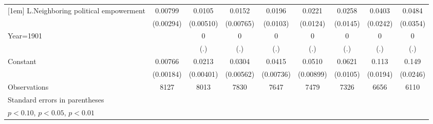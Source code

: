 \begin{table}[htbp]
\begin{tabular}{l*{8}{c}}
[1em]
L.Neighboring political empowerment&     0.00799\sym{***}&      0.0105\sym{**} &      0.0152\sym{**} &      0.0196\sym{*}  &      0.0221\sym{*}  &      0.0258\sym{*}  &      0.0403\sym{*}  &      0.0484         \\
                    &   (0.00294)         &   (0.00510)         &   (0.00765)         &    (0.0103)         &    (0.0124)         &    (0.0145)         &    (0.0242)         &    (0.0354)         \\
[1em]
Year=1901           &                     &           0         &           0         &           0         &           0         &           0         &           0         &           0         \\
                    &                     &         (.)         &         (.)         &         (.)         &         (.)         &         (.)         &         (.)         &         (.)         \\
[1em]
Constant            &     0.00766\sym{***}&      0.0213\sym{***}&      0.0304\sym{***}&      0.0415\sym{***}&      0.0510\sym{***}&      0.0621\sym{***}&       0.113\sym{***}&       0.149\sym{***}\\
                    &   (0.00184)         &   (0.00401)         &   (0.00562)         &   (0.00736)         &   (0.00899)         &    (0.0105)         &    (0.0194)         &    (0.0246)         \\
\hline
Observations        &        8127         &        8013         &        7830         &        7647         &        7479         &        7326         &        6656         &        6110         \\
\hline\hline
\multicolumn{9}{l}{\footnotesize Standard errors in parentheses}\\
\multicolumn{9}{l}{\footnotesize \sym{*} \(p<0.10\), \sym{**} \(p<0.05\), \sym{***} \(p<0.01\)}\\
\end{tabular}
\end{table}
